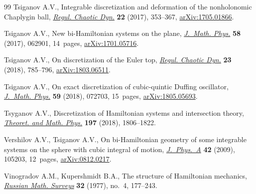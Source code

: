 \begin{thebibliography}{99}
Tsiganov A.V., Integrable discretization and deformation of the nonholonomic
  {C}haplygin ball, \href{https://doi.org/10.1134/S1560354717040025}{\textit{Regul. Chaotic Dyn.}} \textbf{22} (2017), 353--367,
  \href{https://arxiv.org/abs/1705.01866}{arXiv:1705.01866}.

Tsiganov A.V., New bi-{H}amiltonian systems on the plane, \href{https://doi.org/10.1063/1.4989534}{\textit{J.~Math.
  Phys.}} \textbf{58} (2017), 062901, 14~pages, \href{https://arxiv.org/abs/1701.05716}{arXiv:1701.05716}.

Tsiganov A.V., On discretization of the {E}uler top, \href{https://doi.org/10.1134/S1560354718060114}{\textit{Regul. Chaotic
  Dyn.}} \textbf{23} (2018), 785--796, \href{https://arxiv.org/abs/1803.06511}{arXiv:1803.06511}.

Tsiganov A.V., On exact discretization of cubic-quintic {D}uffing oscillator,
  \href{https://doi.org/10.1063/1.5034381}{\textit{J.~Math. Phys.}} \textbf{59} (2018), 072703, 15~pages,
  \href{https://arxiv.org/abs/1805.05693}{arXiv:1805.05693}.

Tsyganov A.V., Discretization of Hamiltonian systems and intersection theory,
  \href{https://doi.org/10.1134/S0040577918120103}{\textit{Theoret. and Math. Phys.}} \textbf{197} (2018), 1806--1822.

Vershilov A.V., Tsiganov A.V., On bi-{H}amiltonian geometry of some integrable
  systems on the sphere with cubic integral of motion, \href{https://doi.org/10.1088/1751-8113/42/10/105203}{\textit{J.~Phys.~A}}
  \textbf{42} (2009), 105203, 12~pages, \href{https://arxiv.org/abs/0812.0217}{arXiv:0812.0217}.

Vinogradov A.M., Kupershmidt B.A., The structure of {H}amiltonian mechanics,
  \href{https://doi.org/10.1070/RM1977v032n04ABEH001642}{\textit{Russian Math. Surveys}} \textbf{32} (1977), no.~4, 177--243.

\end{thebibliography}
